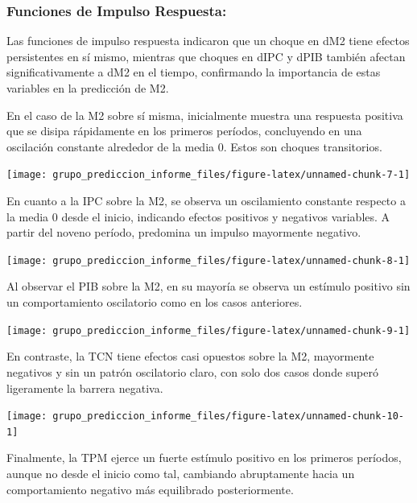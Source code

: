 \documentclass[
  12pt,
]{article}
\begin{document}
\subsubsection{Funciones de Impulso
Respuesta:}\label{funciones-de-impulso-respuesta}

Las funciones de impulso respuesta indicaron que un choque en dM2 tiene
efectos persistentes en sí mismo, mientras que choques en dIPC y dPIB
también afectan significativamente a dM2 en el tiempo, confirmando la
importancia de estas variables en la predicción de M2.

En el caso de la M2 sobre sí misma, inicialmente muestra una respuesta
positiva que se disipa rápidamente en los primeros períodos, concluyendo
en una oscilación constante alrededor de la media 0. Estos son choques
transitorios.

\begin{center}\texttt{[image: grupo\_prediccion\_informe\_files/figure-latex/unnamed-chunk-7-1]} \end{center}

En cuanto a la IPC sobre la M2, se observa un oscilamiento constante
respecto a la media 0 desde el inicio, indicando efectos positivos y
negativos variables. A partir del noveno período, predomina un impulso
mayormente negativo.

\begin{center}\texttt{[image: grupo\_prediccion\_informe\_files/figure-latex/unnamed-chunk-8-1]} \end{center}

Al observar el PIB sobre la M2, en su mayoría se observa un estímulo
positivo sin un comportamiento oscilatorio como en los casos anteriores.

\begin{center}\texttt{[image: grupo\_prediccion\_informe\_files/figure-latex/unnamed-chunk-9-1]} \end{center}

En contraste, la TCN tiene efectos casi opuestos sobre la M2, mayormente
negativos y sin un patrón oscilatorio claro, con solo dos casos donde
superó ligeramente la barrera negativa.

\begin{center}\texttt{[image: grupo\_prediccion\_informe\_files/figure-latex/unnamed-chunk-10-1]} \end{center}

Finalmente, la TPM ejerce un fuerte estímulo positivo en los primeros
períodos, aunque no desde el inicio como tal, cambiando abruptamente
hacia un comportamiento negativo más equilibrado posteriormente.
\end{document}
